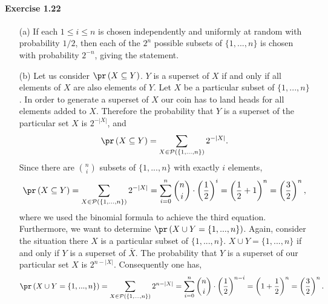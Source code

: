 \paragraph{Exercise 1.22}
\begin{enumerate}
  \item[(a)] If each $1 \leq i \leq n$ is chosen independently and uniformly at
  random with probability $1/2$, then each of the $2^n$ possible subsets of
  $\{ 1, ..., n \}$ is chosen with probability $2^{-n}$, giving the statement.

  \item[(b)] Let us consider $\pr\left( X \subseteq Y \right)$. $Y$ is a superset
  of $X$ if and only if all elements of $X$ are also elements of $Y$. Let $X$ be
  a particular subset of $\{ 1, ..., n \}$. In order to generate a superset of $X$
  our coin has to land heads for all elements added to $X$. Therefore the probability
  that $Y$ is a superset of the particular set $X$ is $2^{-|X|}$, and
  \[ \pr\left( X \subseteq Y \right) = \sum_{X \in \mathcal{P}\left(\{1, ..., n\}\right)} 2^{-|X|}.\]
  Since there are $\binom{n}{i}$ subsets of $\{ 1, ..., n \}$ with exactly $i$
  elements,
  \[ \pr\left( X \subseteq Y \right)
  = \sum_{X \in \mathcal{P}\left(\{1, ..., n\}\right)} 2^{-|X|}
  = \sum_{i=0}^n \binom{n}{i} \cdot \left(\frac{1}{2}\right)^{i}
  = \left( \frac{1}{2} + 1 \right)^n
  = \left( \frac{3}{2} \right)^n,\]
  where we used the binomial formula to achieve the third equation.
  Furthermore, we want to determine $\pr\left( X \cup Y = \{ 1, ..., n \}\right)$.
  Again, consider the situation there $X$ is a particular subset of $\{ 1, ..., n \}$.
  $X \cup Y = \{ 1, ..., n \}$ if and only if $Y$ is a superset of $\bar{X}$.
  The probability that $Y$ is a superset of our particular set $X$ is $2^{n-|X|}$.
  Consequently one has,
  \[ \pr\left( X \cup Y = \{ 1, ..., n \}\right)
  = \sum_{X \in \mathcal{P}\left(\{1, ..., n\}\right)} 2^{n-|X|}
  = \sum_{i=0}^n \binom{n}{i} \cdot \left(\frac{1}{2}\right)^{n-i}
  = \left( 1 + \frac{1}{2} \right)^n
  = \left( \frac{3}{2} \right)^n.\]
\end{enumerate}
